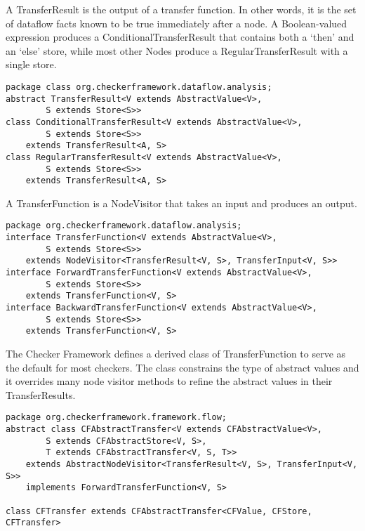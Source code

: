A TransferResult is the output of a transfer function.  In other
words, it is the set of dataflow facts known to be true immediately
after a node.  A Boolean-valued expression produces a
ConditionalTransferResult that contains both a `then' and an `else'
store, while most other Nodes produce a RegularTransferResult with a
single store.

\begin{verbatim}
package class org.checkerframework.dataflow.analysis;
abstract TransferResult<V extends AbstractValue<V>,
        S extends Store<S>>
class ConditionalTransferResult<V extends AbstractValue<V>,
        S extends Store<S>>
    extends TransferResult<A, S>
class RegularTransferResult<V extends AbstractValue<V>,
        S extends Store<S>>
    extends TransferResult<A, S>
\end{verbatim}

\label{sec:transfer_function_classes}

A TransferFunction is a NodeVisitor that takes an input and produces an output.

\begin{verbatim}
package org.checkerframework.dataflow.analysis;
interface TransferFunction<V extends AbstractValue<V>,
        S extends Store<S>>
    extends NodeVisitor<TransferResult<V, S>, TransferInput<V, S>>
interface ForwardTransferFunction<V extends AbstractValue<V>,
        S extends Store<S>>
    extends TransferFunction<V, S>
interface BackwardTransferFunction<V extends AbstractValue<V>,
        S extends Store<S>>
    extends TransferFunction<V, S>
\end{verbatim}

The Checker Framework defines a derived class of TransferFunction to
serve as the default for most checkers.  The class constrains the type
of abstract values and it overrides many node visitor methods to
refine the abstract values in their TransferResults.

\begin{verbatim}
package org.checkerframework.framework.flow;
abstract class CFAbstractTransfer<V extends CFAbstractValue<V>,
        S extends CFAbstractStore<V, S>,
        T extends CFAbstractTransfer<V, S, T>>
    extends AbstractNodeVisitor<TransferResult<V, S>, TransferInput<V, S>>
    implements ForwardTransferFunction<V, S>

class CFTransfer extends CFAbstractTransfer<CFValue, CFStore, CFTransfer>
\end{verbatim}

